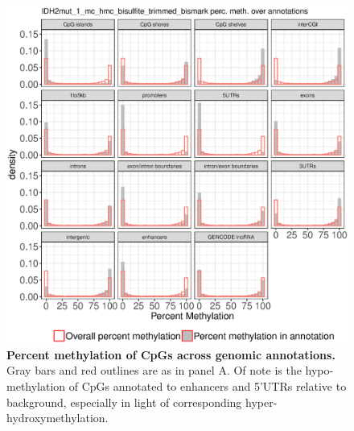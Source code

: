 \begin{figure}[ht!]
\centering
\includegraphics[width=1\textwidth]{chap5figs/figure5_6.eps}
\caption[Percent methylation of CpGs across genomic annotations.]
{
\textbf{Percent methylation of CpGs across genomic annotations.} Gray bars and red outlines are as in panel A. Of note is the hypo-methylation of CpGs annotated to enhancers and 5'UTRs relative to background, especially in light of corresponding hyper-hydroxymethylation.
}
\label{chap5:fig:6}
\end{figure}

\newpage

